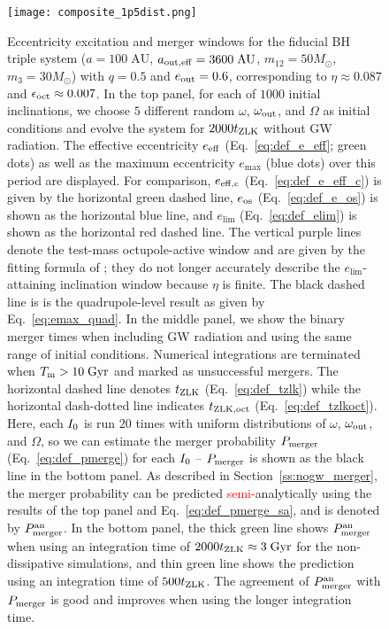 \documentclass[
        fleqn,
        usenatbib,
    ]{mnras}
\begin{document}
\begin{figure}
    \centering
    \texttt{[image: composite\_1p5dist.png]}
    \caption{Eccentricity excitation and merger windows for the fiducial BH
    triple system ($a = 100\;\mathrm{AU}$, $a_{\rm out, eff} =
    3600\;\mathrm{AU}$, $m_{12} = 50M_{\odot}$, $m_3 = 30M_{\odot}$) with $q =
    0.5$ and $e_{\rm out} = 0.6$, corresponding to $\eta \approx 0.087$ and
    $\epsilon_{\rm oct} \approx 0.007$. In the top panel, for each of $1000$
    initial inclinations, we choose $5$ different random $\omega$, $\omega_{\rm
    out}$, and $\Omega$ as initial conditions and evolve the system for
    $2000t_{\rm ZLK}$ without GW radiation. The effective eccentricity $e_{\rm
    eff}$ (Eq.~\ref{eq:def_e_eff}; green dots) as well as the maximum
    eccentricity $e_{\max}$ (blue dots) over this period are displayed. For
    comparison, $e_{\rm eff, c}$ (Eq.~\ref{eq:def_e_eff_c}) is given by the
    horizontal green dashed line, $e_{\rm os}$ (Eq.~\ref{eq:def_e_os}) is shown
    as the horizontal blue line, and $e_{\lim}$ (Eq.~\ref{eq:def_elim}) is shown
    as the horizontal red dashed line. The vertical purple lines denote the
    test-mass octupole-active window and are given by the fitting formula of
    \citet{MLL16}; they do not longer accurately describe the
    $e_{\lim}$-attaining inclination window because $\eta$ is finite. The black
    dashed line is is the quadrupole-level result as given by
    Eq.~\eqref{eq:emax_quad}. In the middle panel, we show the binary merger
    times when including GW radiation and using the same range of initial
    conditions. Numerical integrations are terminated when $T_{\rm m} >
    10\;\mathrm{Gyr}$ and marked as unsuccessful mergers. The horizontal dashed
    line denotes $t_{\rm ZLK}$ (Eq.~\ref{eq:def_tzlk}) while the horizontal
    dash-dotted line indicates $t_{\rm ZLK, oct}$ (Eq.~\ref{eq:def_tzlkoct}).
    Here, each $I_{\rm 0}$ is run $20$ times with uniform distributions of
    $\omega$, $\omega_{\rm out}$, and $\Omega$, so we can estimate the merger
    probability $P_{\rm merger}$ (Eq.~\ref{eq:def_pmerge}) for each $I_{\rm
    0}$ -- $P_{\rm merger}$ %
    is shown as the black line in the bottom panel. As described in
    Section~\ref{ss:nogw_merger}, the merger probability can be predicted
    \textcolor{red}{semi-}analytically using the results of the top panel and
    Eq.~\eqref{eq:def_pmerge_sa}, and is denoted by $P_{\rm merger}^{\rm an}$.
    In the bottom panel, the thick green line shows $P_{\rm merger}^{\rm an}$
    when using an integration time of $2000 t_{\rm ZLK} \approx 3\;\mathrm{Gyr}$
    for the non-dissipative simulations, and thin green line shows the
    prediction using an integration time of $500 t_{\rm ZLK}$. The agreement of
    $P_{\rm merger}^{\rm an}$ with $P_{\rm merger}$ is good and improves when
    using the longer integration time. }\label{fig:composite_dist}
\end{figure}
\end{document}
